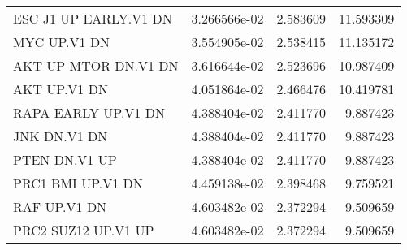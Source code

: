 \begin{tabular}{lrrr}
             ESC J1 UP EARLY.V1 DN &      3.266566e-02 &  2.583609 &       11.593309 \\
                      MYC UP.V1 DN &      3.554905e-02 &  2.538415 &       11.135172 \\
              AKT UP MTOR DN.V1 DN &      3.616644e-02 &  2.523696 &       10.987409 \\
                      AKT UP.V1 DN &      4.051864e-02 &  2.466476 &       10.419781 \\
               RAPA EARLY UP.V1 DN &      4.388404e-02 &  2.411770 &        9.887423 \\
                      JNK DN.V1 DN &      4.388404e-02 &  2.411770 &        9.887423 \\
                     PTEN DN.V1 UP &      4.388404e-02 &  2.411770 &        9.887423 \\
                 PRC1 BMI UP.V1 DN &      4.459138e-02 &  2.398468 &        9.759521 \\
                      RAF UP.V1 DN &      4.603482e-02 &  2.372294 &        9.509659 \\
               PRC2 SUZ12 UP.V1 UP &      4.603482e-02 &  2.372294 &        9.509659 \\
\bottomrule
\end{tabular}
